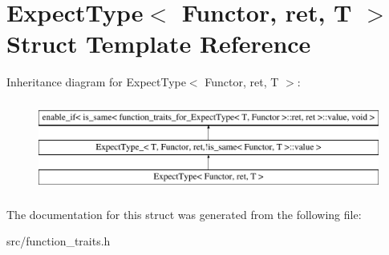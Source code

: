 \hypertarget{struct_expect_type}{\section{Expect\-Type$<$ Functor, ret, T $>$ Struct Template Reference}
\label{struct_expect_type}
}
Inheritance diagram for Expect\-Type$<$ Functor, ret, T $>$\-:\begin{figure}[H]
\begin{center}
\leavevmode
\includegraphics[height=3.000000cm]{struct_expect_type}
\end{center}
\end{figure}


The documentation for this struct was generated from the following file\-:\begin{DoxyCompactItemize}
\item 
src/function\-\_\-traits.\-h\end{DoxyCompactItemize}
